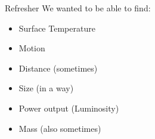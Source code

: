 \documentclass[pdf, aspectratio=169]{beamer}
\begin{document}
\begin{frame}{Refresher}
  We wanted to be able to find:
	\begin{itemize}
	  \item \alert<2->{Surface Temperature}
	  \item \alert<2->{Motion}
	  \item Distance (sometimes)
	  \item {Size (in a way)}
	  \item \alert<3->{Power output (Luminosity)}
	  \item Mass (also sometimes)
	\end{itemize}
\end{frame}

\end{document}

